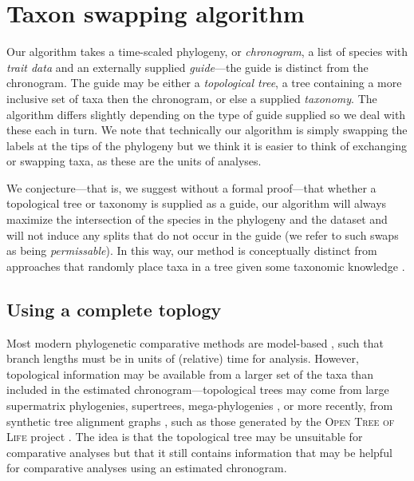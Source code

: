 \documentclass[a4paper,11pt]{article}
\begin{document}
\section{Taxon swapping algorithm}

Our algorithm takes a time-scaled phylogeny, or \emph{chronogram}, a list of species with \emph{trait data} and an externally supplied \emph{guide}---the guide is distinct from the chronogram. The guide may be either a \emph{topological tree}, a tree containing a more inclusive set of taxa then the chronogram, or else a supplied \emph{taxonomy}. The algorithm differs slightly depending on the type of guide supplied so we deal with these each in turn. We note that technically our algorithm is simply swapping the labels at the tips of the phylogeny but we think it is easier to think of exchanging or swapping taxa, as these are the units of analyses.

We conjecture---that is, we suggest without a formal proof---that whether a topological tree or taxonomy is supplied as a guide, our algorithm will always maximize the intersection of the species in the phylogeny and the dataset and will not induce any splits that do not occur in the guide (we refer to such swaps as being \emph{permissable}). In this way, our method is conceptually distinct from approaches that randomly place taxa in a tree given some taxonomic knowledge \citep{Kuhn2011, Jetz2012, ThomasPastis}. 

\subsection{Using a complete toplogy}

Most modern phylogenetic comparative methods are model-based \citep[see recent review by][]{PennellHarmon}, such that branch lengths must be in units of (relative) time for analysis. However, topological information may be available from a larger set of the taxa than included in the estimated chronogram---topological trees may come from large supermatrix phylogenies, supertrees, mega-phylogenies \citep[\emph{sensu}][]{Smithmega}, or more recently, from synthetic tree alignment graphs \citep{Smith2013}, such as those generated by the \textsc{Open Tree of Life} project \citep{OpenTree}. The idea is that the topological tree may be unsuitable for comparative analyses but that it still contains information that may be helpful for comparative analyses using an estimated chronogram. 
\end{document}
